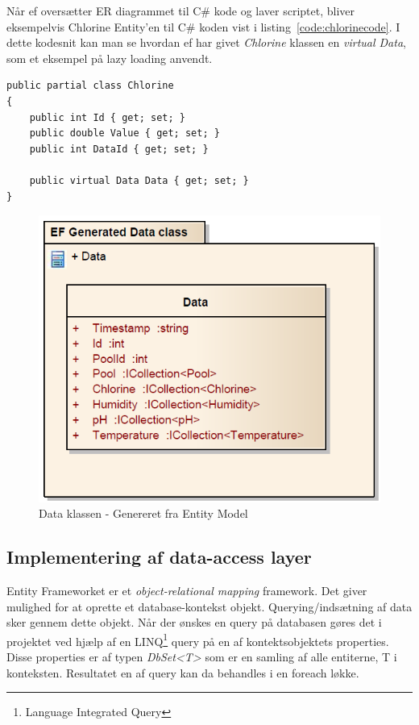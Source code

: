 Når \gls{ef} oversætter ER diagrammet til C\# kode og laver scriptet, bliver eksempelvis Chlorine Entity'en til C\# koden vist i listing~\ref{code:chlorinecode}. I dette kodesnit kan man se hvordan \gls{ef} har givet \textit{Chlorine} klassen en \textit{virtual Data}, som et eksempel på lazy loading anvendt.

\begin{minipage}[h]{\linewidth}
\begin{lstlisting}[caption=C\# kode repræsentationen af Chlorine entity.,label=code:chlorinecode]
public partial class Chlorine
{
	public int Id { get; set; }
	public double Value { get; set; }
	public int DataId { get; set; }
	
	public virtual Data Data { get; set; }
}
\end{lstlisting}
\end{minipage}

\begin{figure}
	\centering
	\includegraphics[width=0.5\linewidth]{figs/implementering/efGeneratedData.PNG}
	\caption{Data klassen - Genereret fra Entity Model}
	\label{fig:efGeneratedData}
\end{figure}

\subsection{Implementering af data-access layer}

Entity Frameworket er et \textit{object-relational mapping} framework. Det giver mulighed for at oprette et database-kontekst objekt. Querying/indsætning af data sker gennem dette objekt. Når der ønskes en query på databasen gøres det i projektet ved hjælp af en LINQ\footnote{Language Integrated Query} query på en af kontektsobjektets properties. Disse properties er af typen \textit{DbSet<T>} som er en samling af alle entiterne, T i konteksten. Resultatet en af query kan da behandles i en foreach løkke.

